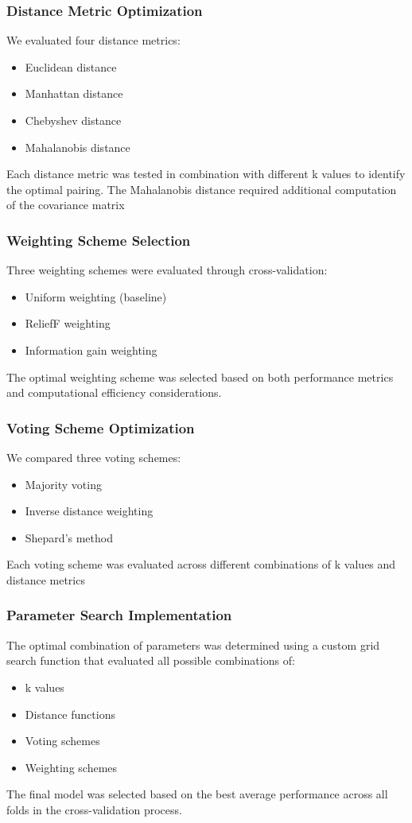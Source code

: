 \subsubsection*{Distance Metric Optimization}
We evaluated four distance metrics:
\begin{itemize}
\item Euclidean distance
\item Manhattan distance
\item Chebyshev distance
\item Mahalanobis distance
\end{itemize}

Each distance metric was tested in combination with different k values to identify the optimal pairing.
The Mahalanobis distance required additional computation of the covariance matrix

\subsubsection*{Weighting Scheme Selection}
Three weighting schemes were evaluated through cross-validation:
\begin{itemize}
\item Uniform weighting (baseline)
\item ReliefF weighting
\item Information gain weighting
\end{itemize}

The optimal weighting scheme was selected based on both performance metrics and computational efficiency considerations.

\subsubsection*{Voting Scheme Optimization}
We compared three voting schemes:
\begin{itemize}
\item Majority voting
\item Inverse distance weighting
\item Shepard's method
\end{itemize}

Each voting scheme was evaluated across different combinations of k values and distance metrics

\subsubsection*{Parameter Search Implementation}
The optimal combination of parameters was determined using a custom grid search function that evaluated all possible combinations of:
\begin{itemize}
    \item k values
    \item Distance functions
    \item Voting schemes
    \item Weighting schemes
\end{itemize}

The final model was selected based on the best average performance across all folds in the cross-validation process.

